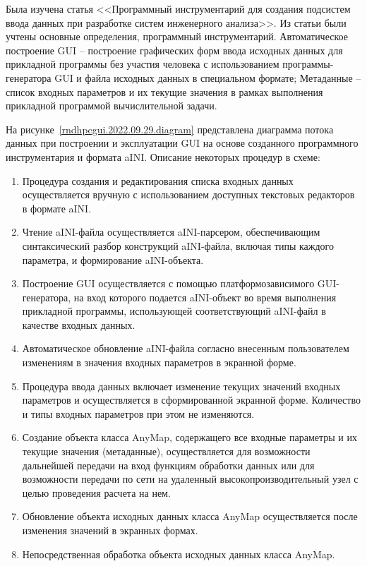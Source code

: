 \def\notedate{2022.09.29}
\def\currentauthor{Василян А.Р. (РК6-73Б)}


Была изучена статья <<Программный инструментарий для создания подсистем ввода данных при разработке систем инженерного анализа>>. Из статьи были учтены основные определения, программный инструментарий. Автоматическое построение GUI -- построение графических форм ввода исходных данных для прикладной программы без участия человека с использованием программы-генератора GUI и файла исходных данных в специальном формате; Метаданные -- список входных параметров и их текущие значения в рамках выполнения прикладной программой вычислительной задачи.

На рисунке~\ref{rndhpcgui.2022.09.29.diagram} представлена диаграмма потока данных при построении и эксплуатации GUI на основе созданного программного инструментария и формата aINI. Описание некоторых процедур в схеме:
\begin{enumerate} [start=0]
	\item Процедура создания и редактирования списка входных данных осуществляется вручную с использованием доступных текстовых редакторов в формате aINI.
	\item Чтение aINI-файла осуществляется aINI-парсером, обеспечивающим синтаксический разбор конструкций aINI-файла, включая типы каждого параметра, и формирование aINI-объекта.
	\item Построение GUI осуществляется с помощью платформозависимого GUI-генератора, на вход которого подается aINI-объект во время выполнения прикладной программы, использующей соответствующий aINI-файл в качестве входных данных.
	\item Автоматическое обновление aINI-файла согласно внесенным пользователем изменениям в значения входных параметров в экранной форме. 
	\item Процедура ввода данных включает изменение текущих значений входных параметров и осуществляется в сформированной экранной форме. Количество и типы входных параметров при этом не изменяются.
	\item Создание объекта класса AnyMap, содержащего все входные параметры и их текущие значения (метаданные), осуществляется для возможности дальнейшей передачи на вход функциям обработки данных или для возможности передачи по сети на удаленный высокопроизводительный узел с целью проведения расчета на нем.
	\item Обновление объекта исходных данных класса AnyMap осуществляется после изменения значений в экранных формах.
	\item Непосредственная обработка объекта исходных данных класса AnyMap.
\end{enumerate}

